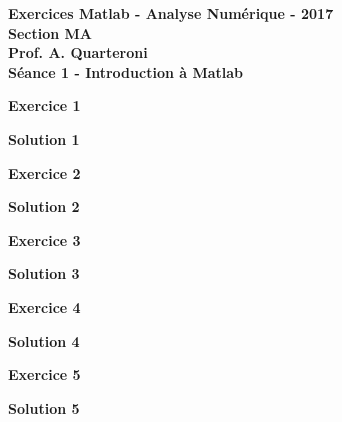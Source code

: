 \begin{center}
  \textbf{Exercices Matlab - Analyse Numérique - 2017 \\
  Section MA \\
  Prof. A. Quarteroni \\
  Séance 1 - Introduction à Matlab}
\end{center}


\vspace{10mm}

\textbf{Exercice 1 \\}


\textbf{Solution 1 \\}




\textbf{Exercice 2 \\}


\textbf{Solution 2 \\}


\textbf{Exercice 3 \\}


\textbf{Solution 3 \\}


\textbf{Exercice 4 \\}


\textbf{Solution 4 \\}


\textbf{Exercice 5 \\}


\textbf{Solution 5 \\}



